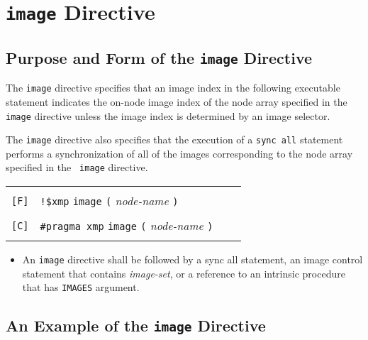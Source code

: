 \section{{\tt image} Directive}
\subsection{Purpose and Form of the {\tt image} Directive}

The {\tt image} directive specifies that 
an image index in the following executable statement
indicates the on-node image index
of the node array specified in the {\tt image} directive
unless the image index is determined by an image selector.


The {\tt image} directive also specifies that 
the execution of a {\tt sync all} statement performs a synchronization
of 
all of the images corresponding to the node array specified in the {\tt
image} directive.


\medskip


\begin{tabular}{llll}
 & & & \\
\verb![F]! & \verb|!$xmp| {\tt image} {\tt (} {\it node-name} {\tt )}\\
 & & & \\
\verb![C]! & \verb|#pragma xmp| {\tt image} {\tt (} {\it node-name} {\tt )}\\
 & & & 
\end{tabular}


\begin{itemize}
 \item An {\tt image} directive shall be followed by a sync all statement,
       an image control statement that contains {\it image-set}, or a reference to
       an intrinsic procedure that has {\tt IMAGES} argument.
\end{itemize}

\subsection{An Example of the {\tt image} Directive}

